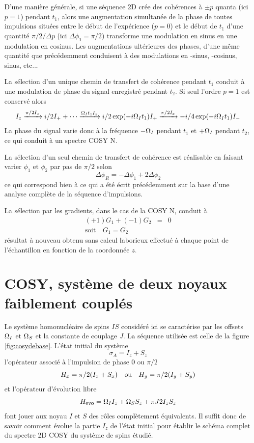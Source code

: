 D'une manière générale, si une séquence 2D crée des cohérences à
$\pm p$ quanta (ici $p=1$) pendant $t_1$, alors une 
augmentation simultanée de la phase de toutes impulsions situées entre
le début de l'expérience ($p=0$) et le début de $t_1$
d'une quantité $\pi/2/\Delta p$ (ici $\Delta\phi_1 = \pi/2$)
transforme une modulation en sinus en une modulation en cosinus.
Les augmentations ultérieures des phases, d'une même quantité
que précédemment conduisent à des modulations
en -sinus, -cosinus, sinus, etc...

La sélection d'un unique chemin de transfert de cohérence
pendant $t_1$ conduit à une modulation de phase du 
signal enregistré pendant $t_2$.
Si seul l'ordre $p=1$ est conservé alors
\begin{equation}
I_z \xrightarrow{\pi/2 I_x} i/2 I_+ + \cdots 
\xrightarrow{\Omega_I t_1 I_z} i/2 \exp(-i \Omega_I t_1) I_+ 
\xrightarrow{\pi/2 I_x} -i/4 \exp(-i \Omega_I t_1) I_-
\end{equation}
La phase du signal varie donc à la fréquence $-\Omega_I$
pendant $t_1$ et $+\Omega_I$ pendant $t_2$,
ce qui conduit à un spectre COSY N.

La sélection d'un seul chemin de transfert de cohérence
est réalisable en faisant varier $\phi_1$ et $\phi_2$ par pas
de $\pi/2$ selon
\begin{equation}
\Delta \phi_R = -\Delta \phi_1 + 2 \Delta \phi_2
\end{equation}
ce qui correspond bien à ce qui a été écrit précédemment
sur la base d'une analyse complète de la séquence d'impulsions.

La sélection par les gradients, dans le cas de la COSY N,
conduit à 
\begin{eqnarray}
(+1) G_1 + (-1) G_2 & = & 0 \\
\mbox{soit}\quad G_1 = G_2
\end{eqnarray}
résultat à nouveau obtenu sans calcul laborieux
effectué à chaque point de l'échantillon en fonction
de la coordonnée $z$.

\section{COSY, système de deux noyaux faiblement couplés}
Le système homonucléaire de spins $IS$ considéré ici se caractérise
par les offsets $\Omega_I$ et $\Omega_S$ et la constante de couplage $J$.
La séquence utilisée est celle de la figure \ref{fig:cosydebase}.
L'état initial du système
\begin{equation}
\sigma_A = I_z + S_z
\end{equation}
l'opérateur associé à l'impulsion de phase 0 ou $\pi/2$
\begin{equation}
H_x = \pi/2(I_x + S_x) \quad \mbox{ou} \quad H_y = \pi/2(I_y + S_y)
\end{equation}
et l'opérateur d'évolution libre
\begin{equation}
H_{\mbox{\footnotesize{evo}}} = \Omega_I I_z + \Omega_S S_z + \pi J 2I_zS_z
\end{equation}
font jouer aux noyau $I$ et $S$ des rôles complètement équivalents.
Il suffit donc de savoir comment évolue la partie $I_z$ de l'état initial
pour établir le schéma complet du spectre 2D COSY du système de spins étudié.

